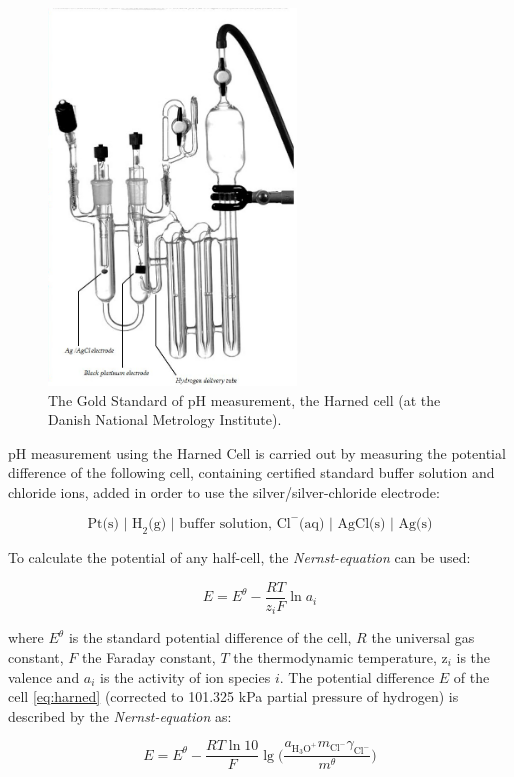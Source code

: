\begin{figure}
\centering
\includegraphics[height=10cm, keepaspectratio]{img/theory/Harned_bw.jpg}
\caption{The Gold Standard of pH measurement, the Harned cell (at the Danish National Metrology Institute).}
\label{fig:harned}
\end{figure}

pH measurement using the Harned Cell is carried out by measuring the potential difference of the following cell, containing certified standard buffer solution and chloride ions, added in order to use the silver/silver-chloride electrode:

\begin{equation}
\textrm{Pt(s) | H}_2\textrm{(g) | buffer solution, Cl}^-\textrm{(aq) | AgCl(s) | Ag(s)}
\label{eq:harned}
\end{equation}

To calculate the potential of any half-cell, the \emph{Nernst-equation} can be used:

\begin{equation}
E = E^\theta - \frac{RT}{z_iF}\ln a_i
\end{equation}

where $E^\theta$ is the standard potential difference of the cell, $R$ the universal gas constant, $F$ the Faraday constant, $T$ the thermodynamic temperature, z$_i$ is the valence and $a_i$ is the activity of ion species $i$.
The potential difference $E$ of the cell \ref{eq:harned} (corrected to 101.325 kPa partial pressure of hydrogen) is described by the \emph{Nernst-equation} as:

\begin{equation}
E = E^\theta - \frac{RT\ln 10}{F}\lg\bigg(\frac{a_{\textrm{H}_3\textrm{O}^+}m_{\textrm{Cl}^-}\gamma_{\textrm{Cl}^-}}{m^\theta}\bigg)
\end{equation}

